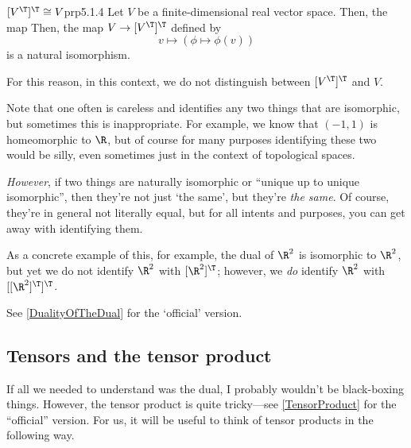 \begin{prp}{$[V^{\T}]^{\T}\cong V$}{prp5.1.4}
	Let $V$ be a finite-dimensional real vector space.  Then, the map Then, the map $V\rightarrow [V^{\T}]^{\T}$ defined by
	\begin{equation}
		v\mapsto (\phi \mapsto \phi (v))
	\end{equation}
	is a natural isomorphism.
	\begin{rmk}
		\begin{important}
		For this reason, in this context, we do not distinguish between $[V^{\T}]^{\T}$ and $V$.
		\end{important}
		
		Note that one often is careless and identifies any two things that are isomorphic, but sometimes this is inappropriate.  For example, we know that $(-1,1)$ is homeomorphic to $\R$, but of course for many purposes identifying these two would be silly, even sometimes just in the context of topological spaces.
		
		\emph{However}, if two things are naturally isomorphic or ``unique up to unique isomorphic'', then they're not just `the same', but they're \emph{the same}.  Of course, they're in general not literally equal, but for all intents and purposes, you can get away with identifying them.
		
		As a concrete example of this, for example, the dual of $\R ^2$ is isomorphic to $\R ^2$, but yet we do not identify $\R ^2$ with $[\R ^2]^{\T}$; however, we \emph{do} identify $\R ^2$ with $[[\R ^2]^{\T}]^{\T}$.
	\end{rmk}
	\begin{rmk}
		See \cref{DualityOfTheDual} for the `official' version.
	\end{rmk}
\end{prp}

\subsection{Tensors and the tensor product}

If all we needed to understand was the dual, I probably wouldn't be black-boxing things.  However, the tensor product is quite tricky---see \cref{TensorProduct} for the ``official'' version.  For us, it will be useful to think of tensor products in the following way.

